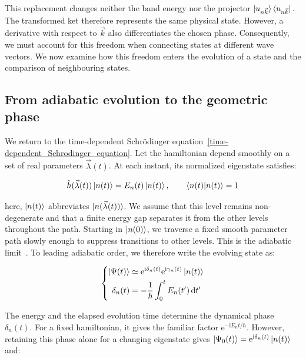 This replacement changes neither the band energy nor the projector
$\ket{u_{n\vec{k}}}\bra{u_{n\vec{k}}}$.
The transformed ket therefore represents the same physical state.
However, a derivative with respect to $\vec{k}$ also differentiates the chosen phase.
Consequently, we must account for this freedom when connecting states at different wave vectors.
We now examine how this freedom enters the evolution of a state and the comparison of neighbouring states.

\FloatBarrier
\subsection{From adiabatic evolution to the geometric phase}
\label{subsec:adiabatic_geometric_phase_appendix}

We return to the time-dependent Schrödinger equation~\eqref{time-dependent_Schrodinger_equation}.
Let the hamiltonian depend smoothly on a set of real parameters $\vec{\lambda}(t)$.
At each instant, its normalized eigenstate satisfies:

\begin{equation}
    \hat{h}(\vec{\lambda}(t))\ket{n(t)}=E_n(t)\ket{n(t)},
    \qquad \braket{n(t)|n(t)}=1
\label{instantaneous_eigenstate_berry_appendix}
\end{equation}

here, $\ket{n(t)}$ abbreviates $\ket{n(\vec{\lambda}(t))}$.
We assume that this level remains non-degenerate and that a finite energy gap separates it from the other levels throughout the path.
Starting in $\ket{n(0)}$, we traverse a fixed smooth parameter path slowly enough to suppress transitions to other levels.
This is the adiabatic limit~\cite{berry1984quantal,xiao2010berry}.
To leading adiabatic order, we therefore write the evolving state as:

\begin{equation}
\left\{\begin{aligned}
    \ket{\Psi(t)}
    &\simeq\mathrm{e}^{\mathrm{i}\delta_n(t)}
    \mathrm{e}^{\mathrm{i}\gamma_n(t)}\ket{n(t)} \\
    \delta_n(t)&=-\frac{1}{\hbar}\int_0^t E_n(t')\,\mathrm{d} t'
\end{aligned}\right.
\label{adiabatic_phase_separation_appendix}
\end{equation}

The energy and the elapsed evolution time determine the dynamical phase $\delta_n(t)$.
For a fixed hamiltonian, it gives the familiar factor $\mathrm{e}^{-\mathrm{i}E_nt/\hbar}$.
However, retaining this phase alone for a changing eigenstate gives
$\ket{\Psi_0(t)}=\mathrm{e}^{\mathrm{i}\delta_n(t)}\ket{n(t)}$ and:

